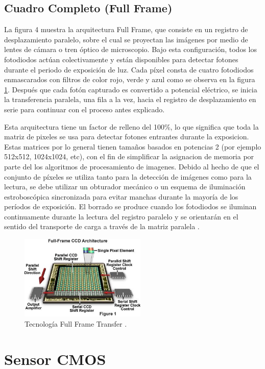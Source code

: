 \documentclass[conference]{IEEEtran}
\begin{document}
\subsection{ \textbf{Cuadro Completo (Full Frame)}}
La figura 4 muestra la arquitectura Full Frame, que consiste en un registro de desplazamiento paralelo, sobre el cual se proyectan las imágenes por medio de lentes de cámara o tren óptico de microscopio. Bajo esta configuración, todos los fotodiodos actúan colectivamente y están disponibles para detectar fotones durante el periodo de exposición de luz. Cada píxel consta de cuatro fotodiodos enmascarados con filtros de color rojo, verde y azul como se observa en la figura \ref{fft_ccd}. Después que cada fotón capturado es convertido a potencial eléctrico, se inicia la transferencia paralela, una fila a la vez, hacia el registro de desplazamiento en serie para continuar con el proceso antes explicado\cite{andor}.

Esta arquitectura tiene un factor de relleno del 100\%, lo que significa que toda la matriz de pixeles se usa para detectar fotones entrantes durante la exposicion. Estas matrices por lo general tienen tama\~nos basados en potencias 2 (por ejemplo 512x512, 1024x1024, etc), con el fin de simplificar la asignacion de memoria por parte del los algoritmos de procesamiento de imagenes. Debido al hecho de que el conjunto de píxeles se utiliza tanto para la detección de imágenes como para la lectura, se debe utilizar un obturador mecánico o un esquema de iluminación estroboscópica sincronizada para evitar manchas durante la mayoría de los períodos de exposición. El borrado se produce cuando los fotodiodos se iluminan continuamente durante la lectura del registro paralelo y se orientarán en el sentido del transporte de carga a través de la matriz paralela \cite{fft_ccd}.


\begin{figure}[H]
\centering
\includegraphics[width=6cm]{fullframeccd}
\caption{Tecnología Full Frame Transfer \cite{fft_ccd}.}
\label{fft_ccd}
\end{figure}


\section{\textbf{Sensor CMOS}}
\end{document}
